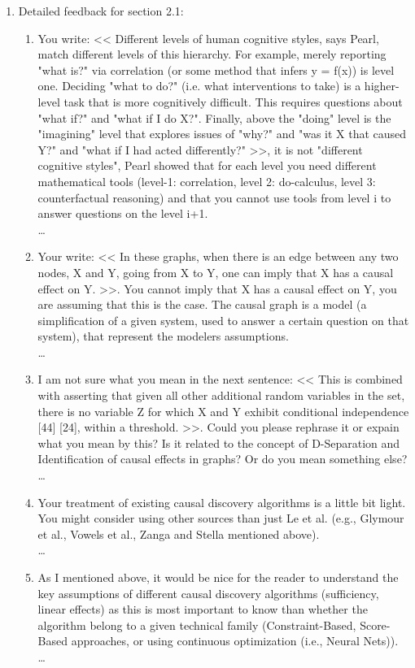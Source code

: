 \documentclass[]{svjour3}
\begin{document}
\begin{enumerate}
\begin{enumerate}
\item Detailed feedback for section 2.1:
\begin{enumerate}
    \item You write: << Different levels of human cognitive styles, says Pearl, match different levels of this hierarchy. For example, merely reporting "what is?" via correlation (or some method that infers y = f(x)) is level one. Deciding "what to do?" (i.e. what interventions to take) is a higher-level task that is more cognitively difficult. This requires questions about "what if?" and "what if I do X?". Finally, above the "doing" level is the "imagining" level that explores issues of "why?" and "was it X that caused Y?" and "what if I had acted differently?" >>, it is not "different cognitive styles", Pearl showed that for each level you need different mathematical tools (level-1: correlation, level 2: do-calculus, level 3: counterfactual reasoning) and that you cannot use tools from level i to answer questions on the level i+1. \\{\MARK \dots}
    \item Your write: << In these graphs, when there is an edge between any two nodes, X and Y, going from X to Y, one can imply that X has a causal effect on Y. >>. You cannot imply that X has a causal effect on Y, you are assuming that this is the case. The causal graph is a model (a simplification of a given system, used to answer a certain question on that system), that represent the modelers assumptions. \\{\MARK \dots}
    \item I am not sure what you mean in the next sentence: << This is combined with asserting that given all other additional random variables in the set, there is no variable Z for which X and Y exhibit conditional independence [44] [24], within a threshold. >>. Could you please rephrase it or expain what you mean by this? Is it related to the concept of D-Separation and Identification of causal effects in graphs? Or do you mean something else?\\{\MARK \dots}
    \item Your treatment of existing causal discovery algorithms is a little bit light.
You might consider using other sources than just Le et al. (e.g., Glymour et al., Vowels et al., Zanga and Stella mentioned above).\\{\MARK \dots}
    \item As I mentioned above, it would be nice for the reader to understand the key assumptions of different causal discovery algorithms (sufficiency, linear effects) as this is most important to know than whether the algorithm belong to a given technical family (Constraint-Based, Score-Based approaches, or using continuous optimization (i.e., Neural Nets)).\\{\MARK \dots}

\end{enumerate}
\end{enumerate}
\end{enumerate}
\end{document}
